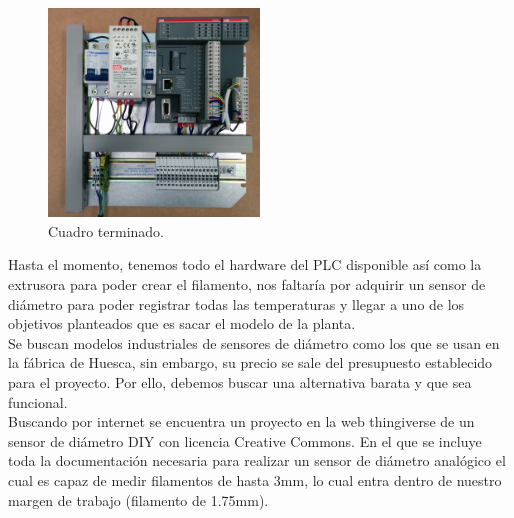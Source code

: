     \begin{figure}[H]
            \centering
            \includegraphics[width=0.5\textwidth]{images/cuadro/IMG_20150331_114950.jpg}
            \caption{Cuadro terminado.}
            \label{fig:cuad_montaje7}
    \end{figure}

Hasta el momento, tenemos todo el hardware del PLC disponible así como la extrusora para poder crear el filamento, nos faltaría por adquirir un sensor de diámetro para poder registrar todas las temperaturas y llegar a uno de los objetivos planteados que es sacar el modelo de la planta.\\

Se buscan modelos industriales de sensores de diámetro como los que se usan en la fábrica de Huesca, sin embargo, su precio se sale del presupuesto establecido para el proyecto. Por ello, debemos buscar una alternativa barata y que sea funcional.\\

Buscando por internet se encuentra un proyecto en la web thingiverse \cite{thing_filamento} de un sensor de diámetro DIY con licencia Creative Commons. En el que se incluye toda la documentación necesaria para realizar un sensor de diámetro analógico el cual es capaz de medir filamentos de hasta 3mm, lo cual entra dentro de nuestro margen de trabajo (filamento de 1.75mm).\\


